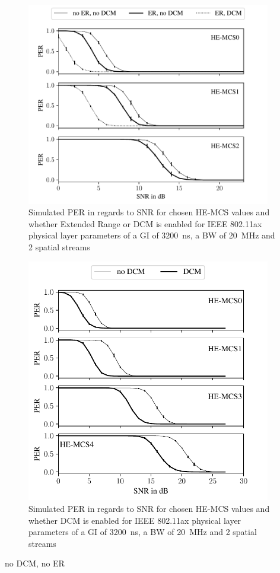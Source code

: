 \begin{figure}%
	\centering
	\includegraphics[width=0.95\textwidth]{figures/ER_PER_to_SNR.pdf}
	\caption{Simulated \ac{PER} in regards to \ac{SNR} for chosen HE-\ac{MCS} values and whether Extended Range or \ac{DCM}
	is enabled for IEEE 802.11ax physical layer parameters of a \ac{GI} of \SI{3200}{\nano\second}, a \ac{BW} of \SI{20}{\mega\hertz} and 2 spatial streams}
	\label{fig:PER_SNR_ER}%
\end{figure}

\begin{figure}%
	\centering
	\includegraphics[width=0.95\textwidth]{figures/DCM_PER_to_SNR.pdf}
	\caption{Simulated \ac{PER} in regards to \ac{SNR} for chosen HE-\ac{MCS} values and whether \ac{DCM} is enabled for IEEE 802.11ax physical layer parameters of a \ac{GI} of \SI{3200}{\nano\second}, a \ac{BW} of \SI{20}{\mega\hertz} and 2 spatial streams}%
	\label{fig:PER_SNR_DCM}%
\end{figure}
no DCM, no ER


